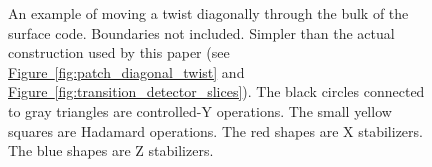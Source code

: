 \documentclass[onecolumn,unpublished,a4paper]{quantumarticle}
\theoremstyle{definition}
\theoremstyle{definition}
\theoremstyle{definition}
\newcommand{\fig}[1]{\hyperref[fig:#1]{Figure~\ref*{fig:#1}}}
\begin{document}
\begin{figure}
    \centering
    \caption{
        An example of moving a twist diagonally through the bulk of the surface code.
        Boundaries not included.
        Simpler than the actual construction used by this paper (see \fig{patch_diagonal_twist} and \fig{transition_detector_slices}).
        The black circles connected to gray triangles are controlled-Y operations.
        The small yellow squares are Hadamard operations.
        The red shapes are X stabilizers.
        The blue shapes are Z stabilizers.
}
\end{figure}
\end{document}

